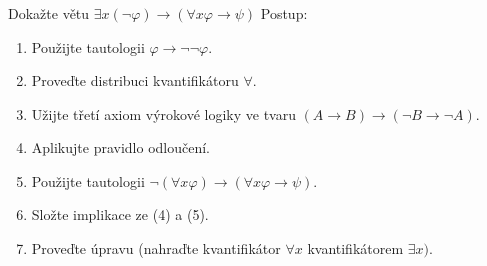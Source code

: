 \subsubsection{}
Dokažte větu $\exists x(\neg \varphi) \rightarrow(\forall x \varphi \rightarrow
\psi)$ Postup:

\begin{enumerate}
  \item Použijte tautologii $\varphi \rightarrow \neg \neg \varphi$.
  \item Proveďte distribuci kvantifikátoru $\forall$.
  \item Užijte třetí axiom výrokové logiky ve tvaru $(A \rightarrow B)
  \rightarrow (\neg B \rightarrow \neg A)$.
  \item Aplikujte pravidlo odloučení.
  \item Použijte tautologii $\neg (\forall x \varphi) \rightarrow(\forall x \varphi \rightarrow
\psi)$.
  \item Složte implikace ze (4) a (5).
  \item Proveďte úpravu (nahraďte kvantifikátor $\forall x$ kvantifikátorem
  $\exists x)$.
\end{enumerate}
